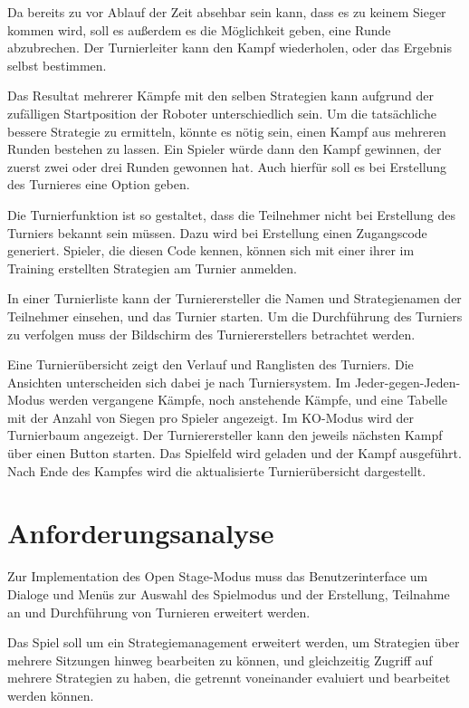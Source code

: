 Da bereits zu vor Ablauf der Zeit absehbar sein kann, dass es zu keinem Sieger kommen wird, soll es
außerdem es die Möglichkeit geben, eine Runde abzubrechen. Der Turnierleiter kann den Kampf
wiederholen, oder das Ergebnis selbst bestimmen.

Das Resultat mehrerer Kämpfe mit den selben Strategien kann aufgrund der zufälligen Startposition
der Roboter unterschiedlich sein. Um die tatsächliche bessere Strategie zu ermitteln, könnte es
nötig sein, einen Kampf aus mehreren Runden bestehen zu lassen. Ein Spieler würde dann den Kampf
gewinnen, der zuerst zwei oder drei Runden gewonnen hat. Auch hierfür soll es bei Erstellung des
Turnieres eine Option geben.

Die Turnierfunktion ist so gestaltet, dass die Teilnehmer nicht bei Erstellung des Turniers bekannt
sein müssen. Dazu wird bei Erstellung einen Zugangscode generiert. Spieler, die diesen Code kennen,
können sich mit einer ihrer im Training erstellten Strategien am Turnier anmelden.

In einer Turnierliste kann der Turnierersteller die Namen und Strategienamen der Teilnehmer
einsehen, und das Turnier starten. Um die Durchführung des Turniers zu verfolgen muss der Bildschirm
des Turniererstellers betrachtet werden.

Eine Turnierübersicht zeigt den Verlauf und Ranglisten des Turniers. Die Ansichten unterscheiden
sich dabei je nach Turniersystem. Im Jeder-gegen-Jeden-Modus werden vergangene Kämpfe, noch
anstehende Kämpfe, und eine Tabelle mit der Anzahl von Siegen pro Spieler angezeigt. Im KO-Modus
wird der Turnierbaum angezeigt. Der Turnierersteller kann den jeweils nächsten Kampf über einen
Button starten. Das Spielfeld wird geladen und der Kampf ausgeführt. Nach Ende des Kampfes wird die
aktualisierte Turnierübersicht dargestellt.


\section{Anforderungsanalyse}

Zur Implementation des Open Stage-Modus muss das Benutzerinterface um Dialoge und Menüs zur Auswahl
des Spielmodus und der Erstellung, Teilnahme an und Durchführung von Turnieren erweitert werden.

Das Spiel soll um ein Strategiemanagement erweitert werden, um Strategien über mehrere Sitzungen
hinweg bearbeiten zu können, und gleichzeitig Zugriff auf mehrere Strategien zu haben, die getrennt
voneinander evaluiert und bearbeitet werden können.

